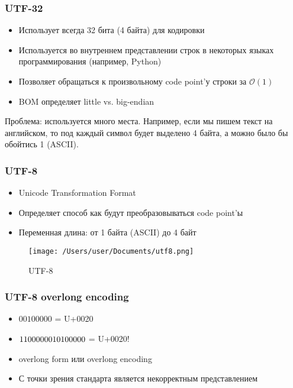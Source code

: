  \subsubsection{UTF-32}
    \begin{itemize}
      \item Использует всегда 32 бита (4 байта) для кодировки
      \item Используется во внутреннем представлении строк в некоторых языках программирования (например, Python)
      \item Позволяет обращаться к произвольному code point'у строки за $\mathcal{O}(1)$
      \item BOM определяет little vs. big-endian
    \end{itemize}
    Проблема: используется много места. Например, если мы пишем текст на английском, то под каждый символ будет выделено 4 байта, а можно было бы обойтись 1 (ASCII).
  
  \subsubsection{UTF-8}
    \begin{itemize}
      \item Unicode Transformation Format
      \item Определяет способ как будут преобразовываться code point'ы
      \item Переменная длина: от 1 байта (ASCII) до 4 байт
    \end{itemize}
    
    \begin{figure}[H]
    \centering
  \texttt{[image: /Users/user/Documents/utf8.png]}
  \caption{UTF-8}
  \label{fig:utf8}
\end{figure}
  
  \subsubsection*{UTF-8 overlong encoding}
    \begin{itemize}
      \item $00100000$ = U+0020
      \item $11000000 \space 10100000$ = U+0020!
      \item overlong form или overlong encoding
      \item С точки зрения стандарта является некорректным представлением
    \end{itemize}